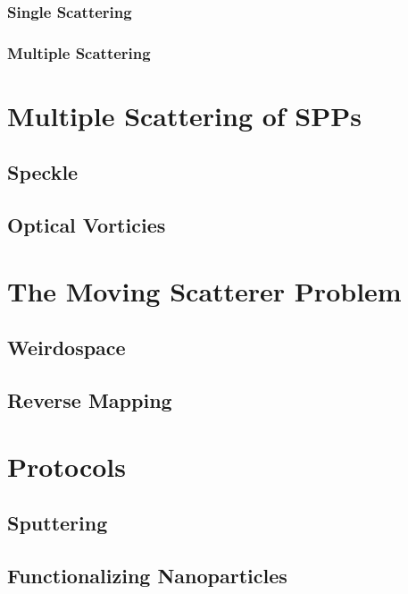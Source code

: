 \documentclass[a4paper,titlepage,onecolumn]{report}
\begin{document}
\subsection{Single Scattering}

\subsection{Multiple Scattering}
 

\chapter{Multiple Scattering of SPPs}
\section{Speckle}
\section{Optical Vorticies}

\chapter{The Moving Scatterer Problem}
\section{Weirdospace}
\section{Reverse Mapping}






\appendix

\chapter{Protocols}
\section{Sputtering}
\section{Functionalizing Nanoparticles}
\end{document}
